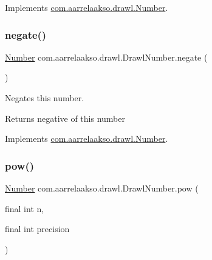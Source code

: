 Implements \hyperlink{interfacecom_1_1aarrelaakso_1_1drawl_1_1_number_a47435944efde1dec963b401dbdf45d62}{com.\+aarrelaakso.\+drawl.\+Number}.

\mbox{\label{classcom_1_1aarrelaakso_1_1drawl_1_1_drawl_number_a7cfa9c1e6042505b82277cb795cc84e3}} 
\subsubsection{\texorpdfstring{negate()}{negate()}}
{\footnotesize\ttfamily \hyperlink{interfacecom_1_1aarrelaakso_1_1drawl_1_1_number}{Number} com.\+aarrelaakso.\+drawl.\+Drawl\+Number.\+negate (\begin{DoxyParamCaption}{ }\end{DoxyParamCaption})}



Negates this number. 

\begin{DoxyReturn}{Returns}
negative of this number 
\end{DoxyReturn}


Implements \hyperlink{interfacecom_1_1aarrelaakso_1_1drawl_1_1_number_abeb61241a83c318464f15c0059d65885}{com.\+aarrelaakso.\+drawl.\+Number}.

\mbox{\label{classcom_1_1aarrelaakso_1_1drawl_1_1_drawl_number_a13f1ea57cce88e852cd7e01b0b3e8cf2}} 
\subsubsection{\texorpdfstring{pow()}{pow()}}
{\footnotesize\ttfamily \hyperlink{interfacecom_1_1aarrelaakso_1_1drawl_1_1_number}{Number} com.\+aarrelaakso.\+drawl.\+Drawl\+Number.\+pow (\begin{DoxyParamCaption}\item[{final int}]{n,  }\item[{final int}]{precision }\end{DoxyParamCaption})}



